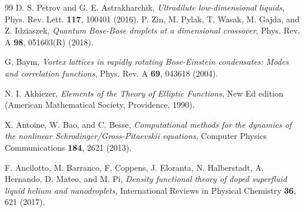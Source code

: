 \documentclass[reprint,aps,pra,twocolumn,superscriptaddress]{revtex4-1}
\begin{document}
\begin{thebibliography}{99}
D. S. Petrov and G. E. Astrakharchik, \textit{Ultradilute low-dimensional liquids},  Phys. Rev. Lett. {\bf 117}, 100401 (2016).
P. Zin, M. Pylak, T. Wasak, M. Gajda, and Z. Idziaszek, \textit{Quantum Bose-Bose droplets at a dimensional crossover}, Phys. Rev. A {\bf 98}, 051603(R) (2018).

 G. Baym, \textit{Vortex lattices in rapidly rotating Bose-Einstein condensates: Modes and correlation functions}, {Phys. Rev. A {\bf 69}, 043618 (2004)}.


   
 N. I. Akhiezer, \textit{Elements of the Theory of Elliptic Functions}, New Ed edition (American Mathematical Society, Providence, 1990).

 X. Antoine, W. Bao, and C. Besse, \textit{Computational methods for the dynamics of the nonlinear Schrodinger/Gross-Pitaevskii equations}, {Computer Physics Communications {\bf 184}, 2621 (2013)}.

 F. Ancilotto, M. Barranco, F. Coppens, J. Eloranta, N. Halberstadt, A. Hernando, D. Mateo, and M. Pi, \textit{Density functional theory of doped superfluid liquid helium and nanodroplets}, {International Reviews in Physical Chemistry {\bf 36}, 621 (2017)}.





\end{thebibliography}
\end{document}
